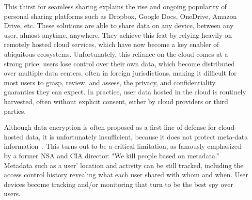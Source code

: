 This thirst for seamless sharing explains the rise and ongoing popularity
of personal sharing platforms such as Dropbox, Google Docs,
OneDrive, Amazon Drive, etc. These solutions are able to share data on any device, between any user, almost
anytime, anywhere. They achieve this feat by relying heavily on
remotely hosted cloud services, which have now become a key enabler of ubiquitous ecosystems. 
Unfortunately, this reliance on the cloud comes at a strong price: 
users lose control over their own data, which become distributed over
multiple data centers, often in foreign jurisdictions, making it difficult for most users to grasp, review, and assess, the privacy, and
confidentiality guaranties they can expect. In practice, user data hosted in the cloud is routinely harvested, often without explicit
consent, either by cloud providers or third parties.

Although data encryption is often proposed as a first line of defense for cloud-hosted data, it is unfortunately  insufficient, because it does not protect meta-data information~\cite{granick_2017, HooffLZZ15, HarnikPS10}. This turns out to be a critical limitation, as famously emphasized by a former NSA and CIA director: "We kill people based on metadata.''~\cite{NaughtonTheGuardian2016} Metadata such as a user'
location and activity can be still tracked, including the access
control history revealing what each user shared with whom and when.
User devices become tracking and/or monitoring \squad that turn to
be the best spy over users. 

